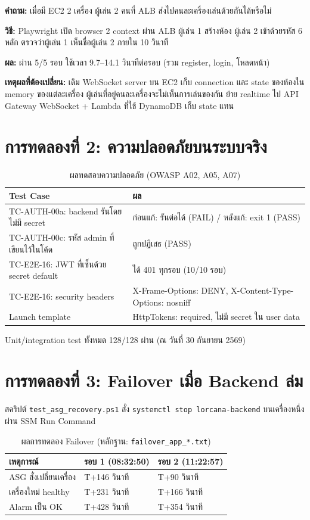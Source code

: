 \documentclass[12pt,a4paper]{report}
\begin{document}
\textbf{คำถาม:} เมื่อมี EC2 2 เครื่อง ผู้เล่น 2 คนที่ ALB ส่งไปคนละเครื่องเล่นด้วยกันได้หรือไม่

\textbf{วิธี:} Playwright เปิด browser 2 context ผ่าน ALB ผู้เล่น 1 สร้างห้อง ผู้เล่น 2 เข้าด้วยรหัส 6 หลัก ตรวจว่าผู้เล่น 1 เห็นชื่อผู้เล่น 2 ภายใน 10 วินาที

\textbf{ผล:} ผ่าน 5/5 รอบ ใช้เวลา 9.7--14.1 วินาทีต่อรอบ (รวม register, login, โหลดหน้า)

\textbf{เหตุผลที่ต้องเปลี่ยน:} เดิม WebSocket server บน EC2 เก็บ connection และ state ของห้องใน memory ของแต่ละเครื่อง ผู้เล่นที่อยู่คนละเครื่องจะไม่เห็นการเล่นของกัน ย้าย realtime ไป API Gateway WebSocket + Lambda ที่ใช้ DynamoDB เก็บ state แทน

\section{การทดลองที่ 2: ความปลอดภัยบนระบบจริง}

\begin{table}[H]
\centering
\caption{ผลทดสอบความปลอดภัย (OWASP A02, A05, A07)}
\begin{tabularx}{\textwidth}{lX}
\toprule
\textbf{Test Case} & \textbf{ผล} \\
\midrule
TC-AUTH-00a: backend รันโดยไม่มี secret & ก่อนแก้: รันต่อได้ (FAIL) / หลังแก้: exit 1 (PASS) \\
TC-AUTH-00c: รหัส admin ที่เขียนไว้ในโค้ด & ถูกปฏิเสธ (PASS) \\
TC-E2E-16: JWT ที่เซ็นด้วย secret default & ได้ 401 ทุกรอบ (10/10 รอบ) \\
TC-E2E-16: security headers & X-Frame-Options: DENY, X-Content-Type-Options: nosniff \\
Launch template & HttpTokens: required, ไม่มี secret ใน user data \\
\bottomrule
\end{tabularx}
\end{table}

Unit/integration test ทั้งหมด 128/128 ผ่าน (ณ วันที่ 30 กันยายน 2569)

\section{การทดลองที่ 3: Failover เมื่อ Backend ล่ม}

สคริปต์ \texttt{test\_asg\_recovery.ps1} สั่ง \texttt{systemctl stop lorcana-backend} บนเครื่องหนึ่งผ่าน SSM Run Command

\begin{table}[H]
\centering
\caption{ผลการทดลอง Failover (หลักฐาน: \texttt{failover\_app\_*.txt})}
\begin{tabularx}{\textwidth}{lXX}
\toprule
\textbf{เหตุการณ์} & \textbf{รอบ 1 (08:32:50)} & \textbf{รอบ 2 (11:22:57)} \\
\midrule
ASG สั่งเปลี่ยนเครื่อง & T+146 วินาที & T+90 วินาที \\
เครื่องใหม่ healthy & T+231 วินาที & T+166 วินาที \\
Alarm เป็น OK & T+428 วินาที & T+354 วินาที \\
\bottomrule
\end{tabularx}
\end{table}
\end{document}
